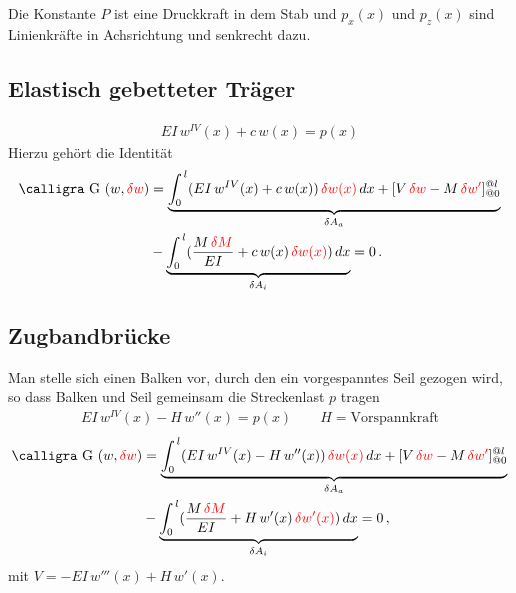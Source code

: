 {{{{Die Konstante $P$ ist eine Druckkraft in dem Stab und $p_x(x)$ und $p_z(x)$ sind Linienkr\"{a}fte in Achsrichtung und senkrecht dazu.

{\textcolor{sectionTitleBlue}{\subsection{Elastisch gebetteter Tr\"{a}ger}}}
\vspace{-0.7cm}
\begin{align}
EI\,w^{IV}(x) + c\,w(x) = p(x)
\end{align}
Hierzu geh\"{o}rt die Identit\"{a}t
\begin{align}
\text{\normalfont\calligra G\,\,}(w,\textcolor{red}{\delta w}) &= \underbrace{\int_0^{\,l} (EI\,w^{IV}(x) + c\,w(x))\,\textcolor{red}{\delta w(x)}\,dx + [V\,\textcolor{red}{\delta w} - M\,\textcolor{red}{\delta w'}]_{@0}^{@l}}_{\delta A_a} \nn  \\
&- \underbrace{\int_0^{\,l}(\frac{M\,\textcolor{red}{\delta M}}{EI} + c\,w(x)\,\textcolor{red}{\delta w(x)})\,dx}_{\delta A_i} = 0\,.
\end{align}

{\textcolor{sectionTitleBlue}{\subsection{Zugbandbr\"{u}cke}}}

Man stelle sich einen Balken vor, durch den ein vorgespanntes Seil gezogen wird, so dass Balken und Seil gemeinsam die Streckenlast $p$ tragen
\begin{align}
EI\,w^{IV}(x) - H\,w''(x) = p(x) \qquad H = \text{Vorspannkraft}
\end{align}
\begin{align}
\text{\normalfont\calligra G\,\,}(w,\textcolor{red}{\delta w}) &= \underbrace{\int_0^{\,l} (EI\,w^{IV}(x) - H\,w''(x))\,\textcolor{red}{\delta w(x)}\,dx + [V\,\textcolor{red}{\delta w} - M\,\textcolor{red}{\delta w'}]_{@0}^{@l}}_{\delta A_a} \nn  \\
&- \underbrace{\int_0^{\,l}(\frac{M\,\textcolor{red}{\delta M}}{EI} + H\,w'(x)\,\textcolor{red}{\delta w'(x)})\,dx}_{\delta A_i} = 0\,,
\end{align}
mit $V = - EI\,w'''(x) + H\,w'(x)$.

}}}}
